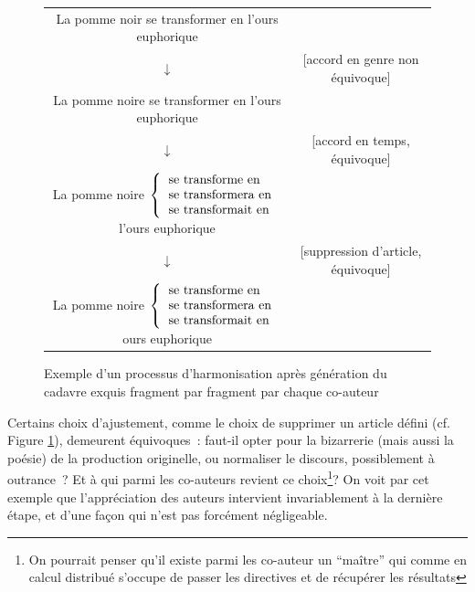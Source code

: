 \documentclass{article}
\begin{document}
				\begin{figure}
					\begin{tabular}{c c}
						La pomme noir se transformer en l'ours euphorique & \\
						$\downarrow$ & [accord en genre non équivoque] \\
						La pomme noire se transformer en l'ours euphorique & \\
						$\downarrow$ & [accord en temps, équivoque]\\
						La pomme noire $\left\lbrace\begin{tabular}{l}
							se transforme en\\
							se transformera en\\
							se transformait en\\
						\end{tabular}\right.$
						l'ours euphorique & \\
						$\downarrow$ & [suppression d'article, équivoque]\\
						La pomme noire 
						$\left\lbrace\begin{tabular}{l}
							se transforme en\\
							se transformera en\\
							se transformait en\\
						\end{tabular}\right.$ ours euphorique & \\
					\end{tabular}
					\caption{Exemple d'un processus d'harmonisation après génération du cadavre exquis fragment par fragment par chaque co-auteur}
					\label{fig:consensus}
				\end{figure}
				
				Certains choix d'ajustement, comme le choix de supprimer un article défini (cf. Figure \ref{fig:consensus}), demeurent équivoques~: faut-il opter pour la bizarrerie (mais aussi la poésie) de la production originelle, ou normaliser le discours, possiblement à outrance~? Et à qui parmi les co-auteurs revient ce choix\footnote{On pourrait penser qu'il existe parmi les co-auteur un ``maître'' qui comme en calcul distribué s'occupe de passer les directives et de récupérer les résultats}? On voit par cet exemple que l'appréciation des auteurs intervient invariablement à la dernière étape, et d'une façon qui n'est pas forcément négligeable.\\
				
\end{document}

